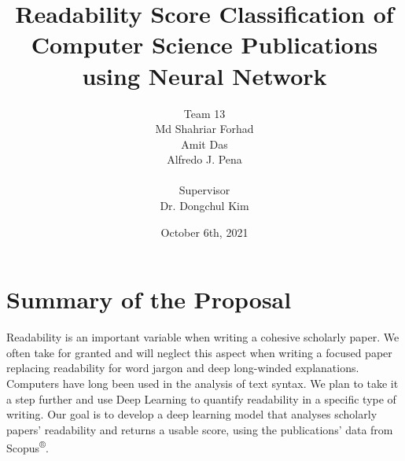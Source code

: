 \documentclass[letterpaper]{article}
\title{Readability Score Classification of Computer Science Publications using Neural Network}
\author{Team 13 \\ Md Shahriar Forhad\\Amit Das\\Alfredo J. Pena\\ \\Supervisor\\Dr. Dongchul Kim}
\date{October 6th, 2021}
\begin{document}
\maketitle

\section*{Summary of the Proposal}
Readability is an important variable when writing a cohesive scholarly paper. We often take for granted and will neglect this aspect when writing a focused paper replacing readability for word jargon and deep long-winded explanations. Computers have long been used in the analysis of text syntax. We plan to take it a step further and use Deep Learning to quantify readability in a specific type of writing. Our goal is to develop a deep learning model that analyses scholarly papers’ readability and returns a usable score, using the publications' data from Scopus\textsuperscript{®}.
\end{document}
